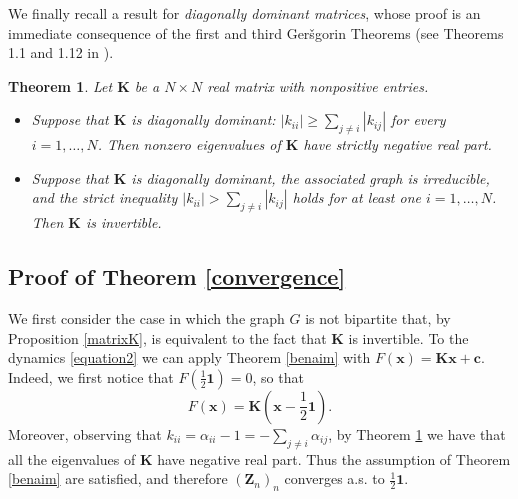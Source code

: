 \documentclass[article,12pt]{article}
\theoremstyle{plain}
\newtheorem{theorem}{Theorem}[section]
\theoremstyle{definition}
\theoremstyle{remark}
\numberwithin{equation}{section}
\numberwithin{theorem}{section}
\begin{document}
		We finally recall a result for {\em diagonally dominant matrices}, whose proof is an immediate consequence of the first and third Ger\v{s}gorin Theorems (see Theorems 1.1 and 1.12 in \cite{varga2011gervsgorin}).
		\begin{theorem}\label{gervsgorin}
			Let $\mathbf{K}$ be a $N \times N$ real matrix with nonpositive entries.
			\begin{itemize}
				\item[(i)]
				Suppose that $\mathbf{K}$ is {\em diagonally dominant}: $|k_{ii}| \geq \sum_{j \neq i} |k_{ij}|$ for every $i =1,\ldots,N$. Then nonzero eigenvalues of $\mathbf{K}$ have strictly negative real part.
				\item[(ii)]
				Suppose that $\mathbf{K}$ is diagonally dominant, the associated graph is irreducible, and the strict inequality $|k_{ii}| > \sum_{j \neq i} |k_{ij}|$ holds for at least one $i =1,\ldots,N$. Then $\mathbf{K}$ is invertible.
			\end{itemize}
		\end{theorem}
		
		\subsection{Proof of Theorem \ref{convergence}  }
		
		We first consider the case in which the graph $G$ is not bipartite that, by Proposition \ref{matrixK}, is equivalent to the fact that $\mathbf{K}$ is invertible. To the dynamics \eqref{equation2} we can apply Theorem \ref{benaim} with $F(\mathbf{x}) = \mathbf{Kx}+\mathbf{c}$. Indeed, we first notice that $F\left(\frac{1}{2}\mathbf{1}\right) = 0$, so that 
		\[
		F(\mathbf{x}) = \mathbf{K} \left(\mathbf{x}- \frac{1}{2}\mathbf{1}\right).
		\]
		Moreover, observing that $k_{ii}=\alpha_{ii}-1=-\sum_{j\neq i}\alpha_{ij}$, by Theorem \ref{gervsgorin} we have that all the eigenvalues of $\mathbf{K}$ have negative real part. Thus the assumption of Theorem \ref{benaim} are satisfied, and therefore $(\mathbf{Z}_n)_n$ converges a.s. to $\frac{1}{2}\mathbf{1}$.
		
\end{document}
